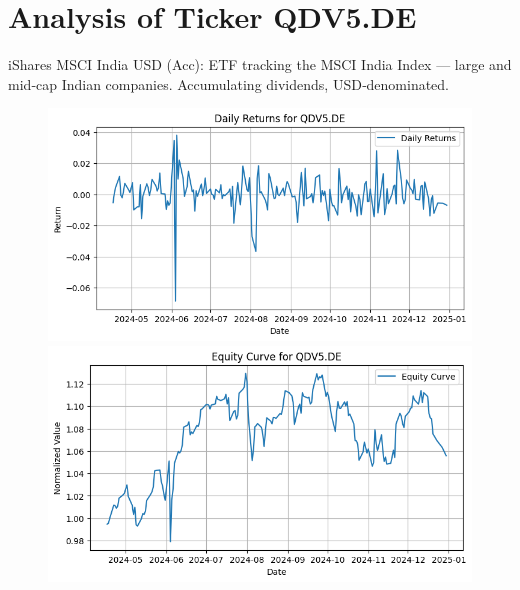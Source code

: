 \documentclass{article}%
\begin{document}
%
\newpage

%
\section*{Analysis of Ticker QDV5.DE}%
\label{sec:AnalysisofTickerQDV5.DE}%
iShares MSCI India USD (Acc): ETF tracking the MSCI India Index — large and mid‑cap Indian companies. Accumulating dividends, USD‑denominated.%


\begin{figure}[htbp]%
\begin{minipage}{0.49\textwidth}%
\includegraphics[width=\linewidth]{ticker_images/QDV5.DE_daily_returns.png}%
\end{minipage}%
\begin{minipage}{0.49\textwidth}%
\includegraphics[width=\linewidth]{ticker_images/QDV5.DE_equity_curve.png}%
\end{minipage}%
\end{figure}

%
\end{document}
